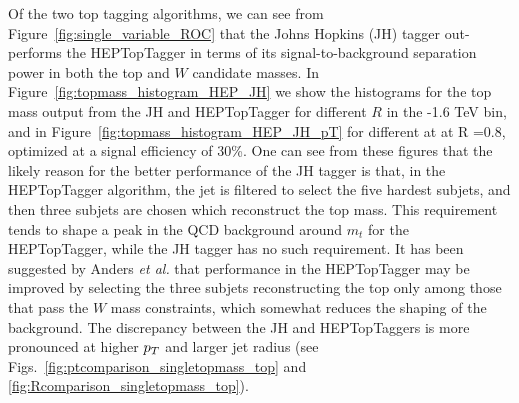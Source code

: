 Of the two top tagging algorithms, we can see from Figure~\ref{fig:single_variable_ROC} that the Johns Hopkins (JH) tagger out-performs the HEPTopTagger in terms of its signal-to-background separation power in both the top and $W$ candidate masses. In Figure~\ref{fig:topmass_histogram_HEP_JH} we show the histograms for the top mass output from the JH and HEPTopTagger for different $R$ in the -1.6 TeV bin, and in Figure~\ref{fig:topmass_histogram_HEP_JH_pT} for different \pt at at R =0.8, optimized at a signal efficiency of 30\%. One can see from these figures that the likely reason for the better performance of the JH tagger is that, in the HEPTopTagger algorithm, the jet is filtered to select the five hardest subjets, and then three subjets are chosen which reconstruct the top mass. This requirement tends to shape a peak in the QCD background around $m_t$ for the HEPTopTagger, while the JH tagger has no such requirement. It has been suggested by Anders \emph{et al.} \cite{Anders:2013oga} that performance in the HEPTopTagger may be improved by selecting the three subjets reconstructing the top only among those that pass the $W$ mass constraints, which somewhat reduces the shaping of the background. The discrepancy between the JH and HEPTopTaggers is more pronounced  at higher $p_T$ and larger jet radius (see Figs.~\ref{fig:ptcomparison_singletopmass_top} and \ref{fig:Rcomparison_singletopmass_top}). 

